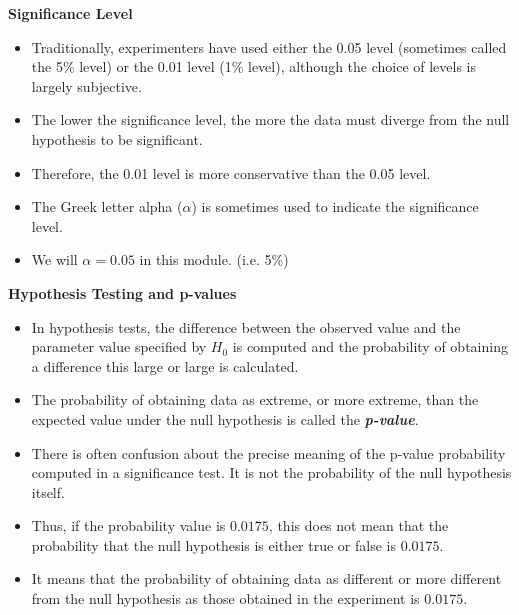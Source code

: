 \documentclass[a4]{beamer}
\begin{document}

\noindent \textbf{Significance Level}

\begin{itemize}
\item Traditionally, experimenters have used either the 0.05 level (sometimes called the 5\% level) or the 0.01 level (1\% level), although the choice of levels is largely subjective.  \item The lower the significance level, the more the data must diverge from the null hypothesis to be significant. \item Therefore, the 0.01 level is more conservative than the 0.05 level. \item The Greek letter alpha ($\alpha$) is sometimes used to indicate the significance level. \item We will $\alpha =0.05$ in this module. (i.e. 5\%) \end{itemize}



\noindent \textbf{Hypothesis Testing and p-values}
\begin{itemize}
\item In hypothesis tests, the difference between the observed value and the parameter value specified by $H_0$ is computed and the probability of obtaining a difference this large or large is calculated.
\item The probability of obtaining data as extreme, or more extreme, than the expected value under the null hypothesis is called the \textbf{\emph{p-value}}.
\item There is often confusion about the precise meaning of the p-value probability computed in a significance test. It is not the probability of the null hypothesis itself.
\item Thus, if the probability value is $0.0175$, this does not mean that the probability that the null hypothesis is either true or false is $0.0175$.
\item It means that the probability of obtaining data as different or more different from the null hypothesis as those obtained in the experiment is $0.0175$.
\end{itemize}


\end{document}
